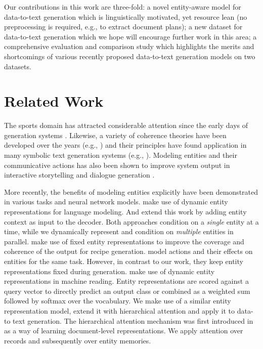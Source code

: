 \documentclass[11pt,a4paper]{article}
\begin{document}
Our contributions in this work are three-fold: a novel entity-aware
model for data-to-text generation which is linguistically motivated,
yet resource lean (no preprocessing is required, e.g., to extract
document plans); a new dataset for data-to-text generation which we
hope will encourage further work in this area; a comprehensive
evaluation and comparison study which highlights the merits and
shortcomings of various recently proposed data-to-text generation
models on two datasets.





\section{Related Work}

The sports domain has attracted considerable attention since the early
days of generation systems
\cite{robin1994revision,P98-2209}. Likewise, a variety of coherence
theories have been developed over the years (e.g.,
\citealt{Mann:Thomson:88,DBLP:journals/coling/GroszJW95}) and their principles
have found application in many symbolic text generation systems (e.g.,
\citealt{Scott:Souza:90,DBLP:journals/coling/KibbleP04}). Modeling entities and their
communicative actions has also been shown to improve system
output in interactive storytelling
\cite{cavazza2002character,cavazza2005dialogue} and dialogue
generation \cite{walker2011perceived}.

More recently, the benefits of modeling entities explicitly have been
demonstrated in various tasks and neural network models.
 make use of dynamic entity representations for
language modeling. And  extend this work by adding
entity context as input to the decoder. Both approaches condition on a
\emph{single} entity at a time, while we dynamically represent and
condition on \emph{multiple} entities in parallel.  
make use of fixed entity representations to improve the coverage and
coherence of the output for recipe generation.
 model actions and their effects on
entities for the same task.  However, in contrast to our work, they
keep entity representations fixed during
generation.  make use of dynamic entity
representations in machine reading. Entity representations are scored
against a query vector to directly predict an output class or combined
as a weighted sum followed by softmax over the vocabulary. We make use
of a similar entity representation model, extend it with hierarchical
attention and apply it to data-to text generation.  The hierarchical
attention mechanism was first introduced in  as a
way of learning document-level representations. We apply attention
over records and subsequently over entity memories.
\end{document}
